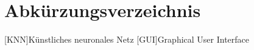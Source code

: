 
\tableofcontents
\listoffigures
\listoftables
\listofformels

\chapter*{Abkürzungsverzeichnis}

\begin{acronym}[SEPSEP]
[KNN]{Künstliches neuronales Netz}
[GUI]{Graphical User Interface}
\end{acronym}  
 
\clearpage
{} 
